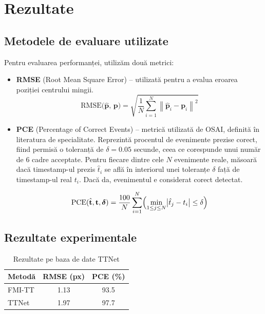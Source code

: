 \chapter{Rezultate}
\section{Metodele de evaluare utilizate}
Pentru evaluarea performanței, utilizăm două metrici:  

\begin{itemize}
    \item \textbf{RMSE} (Root Mean Square Error) – utilizată pentru a evalua eroarea poziției centrului mingii.
    \begin{equation}\label{eq:rmse}
        \text{RMSE($\hat{\mathbf{p}}$, ${\mathbf{p}}$)} = \sqrt{\frac{1}{N}\sum_{i=1}^{N} \left\| \hat{\mathbf{p}}_i - \mathbf{p}_i \right\|^{2}}
    \end{equation}
    \item \textbf{PCE} (Percentage of Correct Events) – metrică utilizată de OSAI, definită în literatura de specialitate\cite{McNally_2019_CVPR_Workshops}. Reprezintă procentul de evenimente prezise corect, fiind permisă o toleranță de $\delta = 0.05$ secunde, ceea ce corespunde unui număr de 6 cadre acceptate. Pentru fiecare dintre cele \( N \) evenimente reale, măsoară dacă timestamp-ul prezis \( \hat{t}_i \) 
    se află în interiorul unei toleranțe \( \delta \) față de timestamp-ul real \( t_i \). 
    Dacă da, evenimentul e considerat corect detectat.

\begin{equation}\label{eq:pce}
    \text{PCE}(\hat{\mathbf t}, \mathbf t, \boldsymbol\delta)
    = \frac{100}{N}
    \sum_{i=1}^{N}
    \Bigl(
      \min_{1 \le j \le N} \bigl|\hat t_j - t_i\bigr|
      \le \delta
    \Bigr)
\end{equation}

\end{itemize}



\section{Rezultate experimentale}

\begin{table}[H]
  \centering
  \caption{Rezultate pe baza de date TTNet}
  \label{tab:ttnet}
  \begin{tabular}{lcc}
    \toprule
    \textbf{Metodă} & \textbf{RMSE (px)} & \textbf{PCE (\%)} \\
    \midrule
    FMI-TT & 1.13 & 93.5 \\
    TTNet       & 1.97 & 97.7 \\
    \bottomrule
  \end{tabular}
\end{table}

